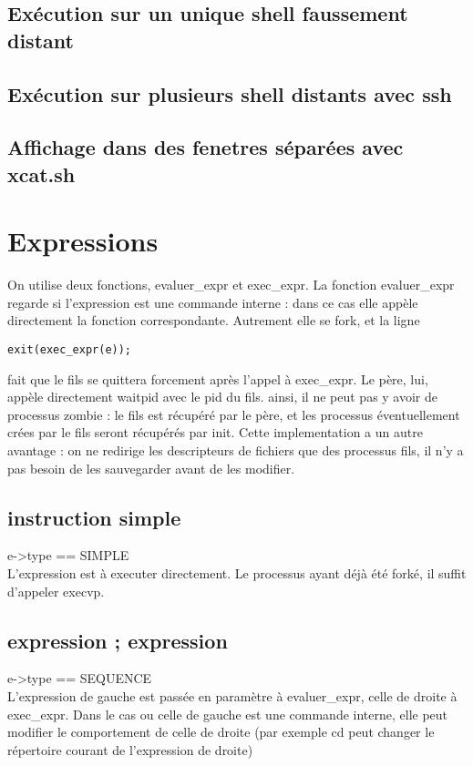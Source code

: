 \documentclass[12pt]{article}
\begin{document}
\subsection{Exécution sur un unique shell faussement distant}

\subsection{Exécution sur plusieurs shell distants avec ssh}

\subsection{Affichage dans des fenetres séparées avec xcat.sh}

\newpage
\section{Expressions}
On utilise deux fonctions, evaluer\_expr et exec\_expr.
La fonction evaluer\_expr regarde si l'expression est une commande interne : dans ce cas elle appèle directement
la fonction correspondante. Autrement elle se fork, et la ligne 
\begin{verbatim}
exit(exec_expr(e));
\end{verbatim}
fait que le fils se quittera forcement après l'appel à exec\_expr.
\newline Le père, lui, appèle directement waitpid avec le pid du fils.
ainsi, il ne peut pas y avoir de processus zombie : le fils est récupéré par le père,
et les processus éventuellement crées par le fils seront récupérés par init.\newline
Cette implementation a un autre avantage : on ne redirige les descripteurs de fichiers que des processus fils,
il n'y a pas besoin de les sauvegarder avant de les modifier.


\subsection{instruction simple}
e->type == SIMPLE\\
L'expression est à executer directement.
Le processus ayant déjà été forké, il suffit d'appeler execvp.

\subsection{expression ; expression}
e->type == SEQUENCE\\
L'expression de gauche est passée en paramètre à evaluer\_expr, celle de droite à exec\_expr.
Dans le cas ou celle de gauche est une commande interne, elle peut modifier le comportement de celle de droite
(par exemple cd peut changer le répertoire courant de l'expression de droite)
\end{document}
